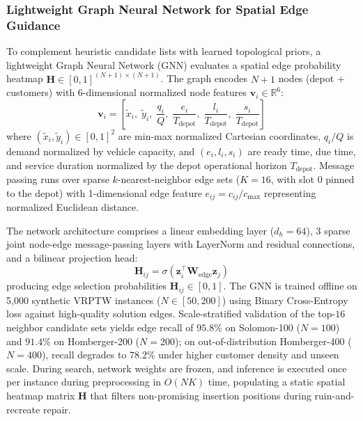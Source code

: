 \documentclass{ieeeaccess}
\begin{document}
\subsubsection{Lightweight Graph Neural Network for Spatial Edge Guidance}
\label{sec:gnn_guidance}
To complement heuristic candidate lists with learned topological priors, a lightweight Graph Neural Network (GNN) evaluates a spatial edge probability heatmap $\mathbf{H} \in [0, 1]^{(N+1)\times (N+1)}$. The graph encodes $N+1$ nodes (depot + customers) with 6-dimensional normalized node features $\mathbf{v}_i \in \mathbb{R}^6$:
\begin{equation}
  \mathbf{v}_i = \left[ \tilde{x}_i, \; \tilde{y}_i, \; \frac{q_i}{Q}, \; \frac{e_i}{T_{\text{depot}}}, \; \frac{l_i}{T_{\text{depot}}}, \; \frac{s_i}{T_{\text{depot}}} \right]
  \label{eq:gnn_node_feats}
\end{equation}
where $(\tilde{x}_i, \tilde{y}_i) \in [0, 1]^2$ are min-max normalized Cartesian coordinates, $q_i / Q$ is demand normalized by vehicle capacity, and $(e_i, l_i, s_i)$ are ready time, due time, and service duration normalized by the depot operational horizon $T_{\text{depot}}$. Message passing runs over sparse $k$-nearest-neighbor edge sets ($K=16$, with slot 0 pinned to the depot) with 1-dimensional edge feature $e_{ij} = c_{ij} / c_{\max}$ representing normalized Euclidean distance.

The network architecture comprises a linear embedding layer ($d_h = 64$), 3 sparse joint node-edge message-passing layers with LayerNorm and residual connections, and a bilinear projection head:
\begin{equation}
  \mathbf{H}_{ij} = \sigma\left( \mathbf{z}_i^{\top} \mathbf{W}_{\text{edge}} \mathbf{z}_j \right)
  \label{eq:gnn_bilinear_head}
\end{equation}
producing edge selection probabilities $\mathbf{H}_{ij} \in [0, 1]$. The GNN is trained offline on 5,000 synthetic VRPTW instances ($N \in [50, 200]$) using Binary Cross-Entropy loss against high-quality solution edges. Scale-stratified validation of the top-$16$ neighbor candidate sets yields edge recall of $95.8\%$ on Solomon-100 ($N=100$) and $91.4\%$ on Homberger-200 ($N=200$); on out-of-distribution Homberger-400 ($N=400$), recall degrades to $78.2\%$ under higher customer density and unseen scale. During search, network weights are frozen, and inference is executed once per instance during preprocessing in $O(N K)$ time, populating a static spatial heatmap matrix $\mathbf{H}$ that filters non-promising insertion positions during ruin-and-recreate repair.
\end{document}
